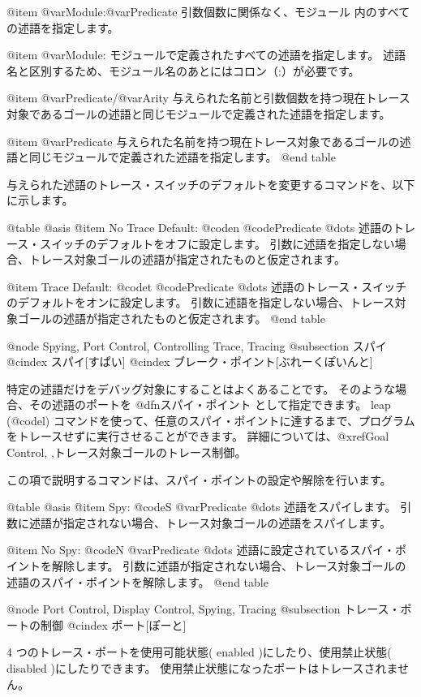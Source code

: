 {{{{@item @var{Module}:@var{Predicate}
引数個数に関係なく、モジュール 内のすべての述語を指定します。

@item @var{Module}:
モジュールで定義されたすべての述語を指定します。
述語名と区別するため、モジュール名のあとにはコロン（:）が必要です。

@item @var{Predicate}/@var{Arity}
与えられた名前と引数個数を持つ現在トレース対象であるゴールの述語と同じモジュールで定義された述語を指定します。

@item @var{Predicate}
与えられた名前を持つ現在トレース対象であるゴールの述語と同じモジュールで定義された述語を指定します。
@end table

与えられた述語のトレース・スイッチのデフォルトを変更するコマンドを、以下に示します。

@table @asis
@item No Trace Default: @code{n} @code{Predicate} @dots{}
述語のトレース・スイッチのデフォルトをオフに設定します。
引数に述語を指定しない場合、トレース対象ゴールの述語が指定されたものと仮定されます。

@item Trace Default: @code{t} @code{Predicate} @dots{}
述語のトレース・スイッチのデフォルトをオンに設定します。
引数に述語を指定しない場合、トレース対象ゴールの述語が指定されたものと仮定されます。
@end table

@node Spying, Port Control, Controlling Trace, Tracing
@subsection スパイ
@cindex スパイ[すぱい]
@cindex ブレーク・ポイント[ぶれーくぽいんと]

特定の述語だけをデバッグ対象にすることはよくあることです。
そのような場合、その述語のポートを @dfn{スパイ・ポイント} として指定できます。
 leap (@code{l}) コマンドを使って、任意のスパイ・ポイントに達するまで、プログラムをトレースせずに実行させることができます。
詳細については、@xref{Goal Control, ,トレース対象ゴールのトレース制御}。

この項で説明するコマンドは、スパイ・ポイントの設定や解除を行います。

@table @asis
@item Spy: @code{S} @var{Predicate} @dots{}
述語をスパイします。
引数に述語が指定されない場合、トレース対象ゴールの述語をスパイします。

@item No Spy: @code{N} @var{Predicate} @dots{}
述語に設定されているスパイ・ポイントを解除します。
引数に述語が指定されない場合、トレース対象ゴールの述語のスパイ・ポイントを解除します。
@end table

@node Port Control, Display Control, Spying, Tracing
@subsection トレース・ポートの制御
@cindex ポート[ぽーと]

4 つのトレース・ポートを使用可能状態( enabled )にしたり、使用禁止状態( disabled )にしたりできます。
使用禁止状態になったポートはトレースされません。

}}}}
